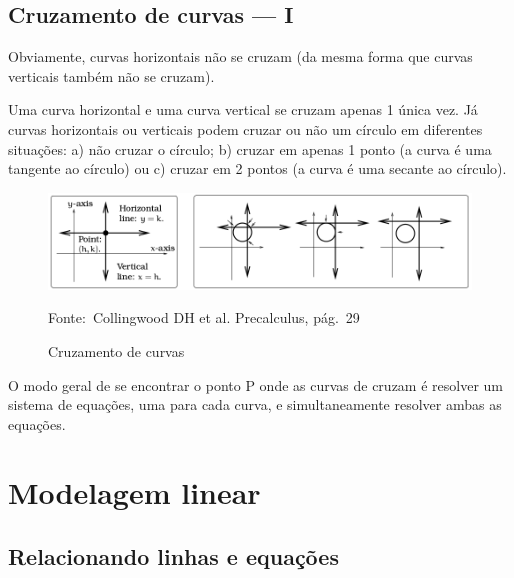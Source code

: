 \documentclass[pdftex, brazil, 12pt, twoside]{article}
\begin{document}
\subsection{Cruzamento de curvas --- I}
\label{tres-curvas-cruzamento-I}

Obviamente, curvas horizontais não se cruzam (da mesma forma que
curvas verticais também não se cruzam).

Uma curva horizontal e uma curva vertical se cruzam apenas 1 única vez.
Já curvas horizontais ou verticais podem cruzar ou não um círculo em diferentes
situações: a) não cruzar o círculo; b) cruzar em apenas 1 ponto (a curva é uma tangente
ao círculo) ou c) cruzar em 2 pontos (a curva é uma secante ao círculo).

\begin{figure}[ht]
  \begin{center}
    \caption{Cruzamento de curvas}
    \label{fig:curvas-cruzamento-1}
    \includegraphics[scale=0.6]{imagens/cruzamento-curvas-1.png}
    
    \footnotesize{Fonte:~Collingwood DH et al. Precalculus, pág.\ 29}
  \end{center}
\end{figure}

O modo geral de se encontrar o ponto P onde as curvas de cruzam é resolver um
sistema de equações, uma para cada curva, e simultaneamente resolver ambas as
equações.


\section{Modelagem linear}
\label{modelagem-linear}

\subsection{Relacionando linhas e equações}
\label{modelagem-linear-relacionando-linhas}
\end{document}

